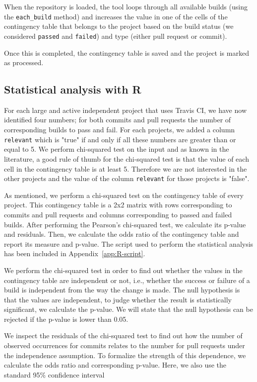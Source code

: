 	When the repository is loaded, the tool loops through all available builds (using the \texttt{each\_build} method) and increases the value in one of the cells of the contingency table that belongs to the project based on the build status (we considered \texttt{passed} and \texttt{failed}) and type (either pull request or commit).
	
	Once this is completed, the contingency table is saved and the project is marked as processed.

\subsection{Statistical analysis with R}
For each large and active independent project that uses Travis CI, we have now identified four numbers; for both commits and pull requests the number of corresponding builds to pass and fail.
For each projects, we added a column \texttt{relevant} which is "true" if and only if all these numbers are greater than or equal to 5.
We perform chi-squared test on the input and as known in the literature, a good rule of thumb for the chi-squared test is that the value of each cell in the contingency table is at least 5.
Therefore we are not interested in the other projects and the value of the column \texttt{relevant} for those projects is "false".

As mentioned, we perform a chi-squared test on the contingency table of every project.
This contingency table is a 2x2 matrix with rows corresponding to commits and pull requests and columns corresponding to passed and failed builds.
After performing the Pearson's chi-squared test, we calculate its p-value and residuals.
Then, we calculate the odds ratio of the contingency table and report its measure and p-value. 
The script used to perform the statistical analysis has been included in Appendix~\ref{app:R-script}.

We perform the chi-squared test in order to find out whether the values in the contingency table are independent or not, i.e., whether the success or failure of a build is independent from the way the change is made.
The null hypothesis is that the values are independent, to judge whether the result is statistically significant, we calculate the p-value.
We will state that the null hypothesis can be rejected if the p-value is lower than 0.05.

We inspect the residuals of the chi-squared test to find out how the number of observed occurrences for commits relates to the number for pull requests under the independence assumption.
To formalize the strength of this dependence, we calculate the odds ratio and corresponding p-value. 
Here, we also use the standard 95\% confidence interval

